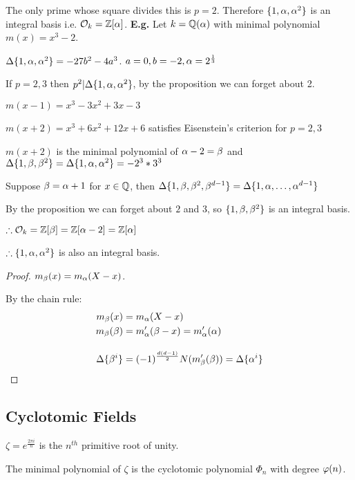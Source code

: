 \documentclass[11pt]{article}
\begin{document}
The only prime whose square divides this is $p=2$. Therefore $\{1, \alpha, \alpha^2 \}$ is an integral basis i.e. $\mathcal{O}_k = \mathbb{Z}[\alpha]$.
\spac
\textbf{E.g.} Let $k = \mathbb{Q}(\alpha) $ with minimal polynomial $m(x) = x^3-2$.

$\Delta \{1,\alpha, \alpha^2 \} = -27b^2 - 4a^3$. $a=0, b=-2, \alpha=2^{\frac{1}{3}}$
\spa

If $p=2,3$ then $p^2 | \Delta\{1,\alpha,\alpha^2 \}$, by the proposition we can forget about 2.
\spa

$m(x-1) = x^3-3x^2+3x-3$
\spa

$m(x+2) = x^3+6x^2 +12x+6$ satisfies Eisenstein's criterion for $p=2,3$
\spa

$m(x+2) $ is the minimal polynomial of $\alpha-2 =\beta$ and $\Delta\{ 1,\beta, \beta^2\} = \Delta\{1,\alpha,\alpha^2 \} = -2^3*3^3$
\spac
\begin{prop} Suppose $\beta = \alpha+1$ for $x \in \mathbb{Q}$, then $\Delta\{1,\beta, \beta^2, \beta^{d-1} \} = \Delta\{ 1, \alpha, \dots, \alpha^{d-1} \}$ 
\end{prop}

By the proposition we can forget about $2 $ and $3$, so $\{1,\beta,\beta^2\}$ is an integral basis.

$\therefore \mathcal{O}_k = \mathbb{Z}[\beta] = \mathbb{Z}[\alpha-2] = \mathbb{Z}[\alpha]$

$\therefore \{1,\alpha,\alpha^2 \}$ is also an integral basis.

\begin{proof}
	$m_\beta(x) =m_\alpha(X-x)$.

	By the chain rule:
	\begin{align*}
		m_\beta(x) &= m_\alpha(X-x)\\
		m_\beta(\beta)&= m_\alpha'(\beta-x) = m_\alpha'(\alpha)\\[1em]
		\Delta\{ \beta^i \} &= (-1)^\frac{d(d-1)}{2} N(m'_\beta(\beta)) = \Delta\{\alpha^i\}
	\end{align*}
\end{proof}

\subsection{Cyclotomic Fields}

$\zeta = e^{\frac{2 \pi i}{n}}$ is the $n^{th}$ primitive root of unity.

\begin{theorem}
	The minimal polynomial of $\zeta$ is the cyclotomic polynomial $\Phi_n$ with degree $\varphi(n)$.
\end{theorem}
\end{document}
